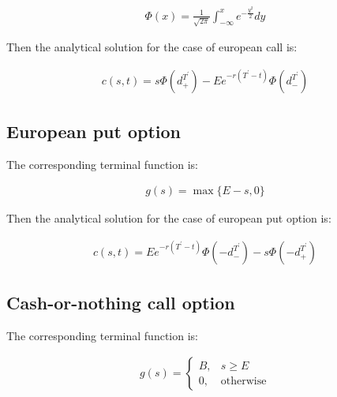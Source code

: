 \documentclass[11pt,a4paper]{extarticle}
\begin{document}
\begin{equation}
    \begin{aligned}
    \Phi(x)=\frac{1}{\sqrt{2\pi}}\int_{-\infty}^xe^{-\frac{y^2}{2}}dy
    \end{aligned}
    \end{equation}

Then the analytical solution for the case of european call is:

\begin{equation}
    \begin{aligned}
    c(s,t) = s\Phi(d_{+}^{T^\prime})-Ee^{-r(T^\prime-t)}\Phi(d_{-}^{T^\prime})
    \end{aligned}
    \end{equation}

\subsection{European put option}

The corresponding terminal function is:

\begin{equation}
    \begin{aligned}
    g(s)=\max\{E-s, 0\}
    \end{aligned}
    \end{equation}

Then the analytical solution for the case of european put option is:

\begin{equation}
    \begin{aligned}
    c(s,t) = Ee^{-r(T^\prime-t)}\Phi(-d_{-}^{T^\prime})-s\Phi(-d_{+}^{T^\prime})
    \end{aligned}
    \end{equation}

\subsection{Cash-or-nothing call option}

The corresponding terminal function is:

\begin{equation}
    \begin{aligned}
    g(s)=\begin{cases}B,&s\geq E \\ 0,&\text{otherwise}\end{cases}
    \end{aligned}
    \end{equation}
\end{document}
